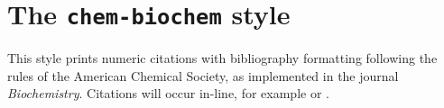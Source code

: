 \documentclass[a4paper]{article}
\begin{document}
\section*{The \texttt{chem-biochem} style}

This style prints numeric citations with bibliography
formatting following the rules of the American Chemical Society,
as implemented in the journal \emph{Biochemistry}. Citations 
will occur in-line, for example \autocite{Kabbe1973} or
\autocite{Arduengo1991}.

\nocite{*}

\printbibliography
\end{document}
